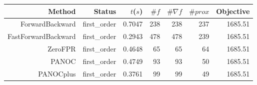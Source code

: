 \begin{tabular}{rrrrrrr}
  \toprule
  \textbf{Method} & \textbf{Status} & \textbf{$t$($s$)} & \textbf{$\#f$} & \textbf{$\#\nabla f$} & \textbf{$\#prox$} & \textbf{Objective} \\
  \midrule
  ForwardBackward & first\_order & 0.7047 & 238 & 238 & 237 & 1685.51 \\
  FastForwardBackward & first\_order & 0.2943 & 478 & 478 & 239 & 1685.51 \\
  ZeroFPR & first\_order & 0.4648 & 65 & 65 & 64 & 1685.51 \\
  PANOC & first\_order & 0.4749 & 93 & 93 & 50 & 1685.51 \\
  PANOCplus & first\_order & 0.3761 & 99 & 99 & 49 & 1685.51 \\
  \bottomrule
\end{tabular}
